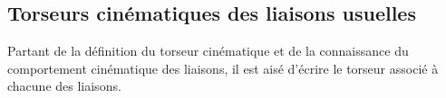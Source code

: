 \documentclass[10pt,oneside]{article}
\begin{document}
\subsection{Torseurs cinématiques des liaisons usuelles}
Partant de la définition du torseur cinématique et de la connaissance du comportement cinématique des liaisons, il est aisé d'écrire le torseur associé à chacune des liaisons.

\begin{center}
\end{center}
\end{document}
